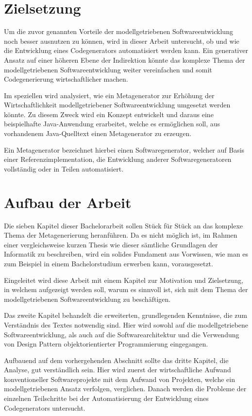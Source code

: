 \documentclass[12pt,oneside,a4paper,parskip]{scrbook}
\begin{document}
\section{Zielsetzung}

Um die zuvor genannten Vorteile der modellgetriebenen Softwareentwicklung noch besser ausnutzen zu können, wird in dieser Arbeit untersucht, ob und wie die Entwicklung eines Codegenerators automatisiert werden kann. Ein generativer Ansatz auf einer höheren Ebene der Indirektion könnte das komplexe Thema der modellgetriebenen Softwareentwicklung weiter vereinfachen und somit Codegenerierung wirtschaftlicher machen.

Im speziellen wird analysiert, wie ein Metagenerator zur Erhöhung der Wirtschaftlichkeit modellgetriebener Softwareentwicklung umgesetzt werden könnte. Zu diesem Zweck wird ein Konzept entwickelt und daraus eine beispielhafte Java-Anwendung erarbeitet, welche es ermöglichen soll, aus vorhandenem Java-Quelltext einen Metagenerator zu erzeugen.

Ein Metagenerator bezeichnet hierbei einen Softwaregenerator, welcher auf Basis einer Referenzimplementation, die Entwicklung anderer Softwaregeneratoren vollständig oder in Teilen automatisiert.

\section{Aufbau der Arbeit}

Die sieben Kapitel dieser Bachelorarbeit sollen Stück für Stück an das komplexe Thema der Metagenerierung heranführen. Da es nicht möglich ist, im Rahmen einer vergleichsweise kurzen Thesis wie dieser sämtliche Grundlagen der Informatik zu beschreiben, wird ein solides Fundament aus Vorwissen, wie man es zum Beispiel in einem Bachelorstudium erwerben kann, vorausgesetzt.

Eingeleitet wird diese Arbeit mit einem Kapitel zur Motivation und Zielsetzung, in welchem aufgezeigt werden soll, warum es sinnvoll ist, sich mit dem Thema der modellgetriebenen Softwareentwicklung zu beschäftigen.

Das zweite Kapitel behandelt die erweiterten, grundlegenden Kenntnisse, die zum Verständnis des Textes notwendig sind. Hier wird sowohl auf die modellgetriebene Softwareentwicklung, als auch auf die Softwarearchitektur und die Verwendung von Design Pattern objektorientierter Programmierung eingegangen.

Aufbauend auf dem vorhergehenden Abschnitt sollte das dritte Kapitel, die Analyse, gut verständlich sein. Hier wird zuerst der wirtschaftliche Aufwand konventioneller Softwareprojekte mit dem Aufwand von Projekten, welche ein modellgetriebenen Ansatz verfolgen, verglichen. Danach werden die Probleme der einzelnen Teilschritte bei der Automatisierung der Entwicklung eines Codegenerators untersucht.
\end{document}
